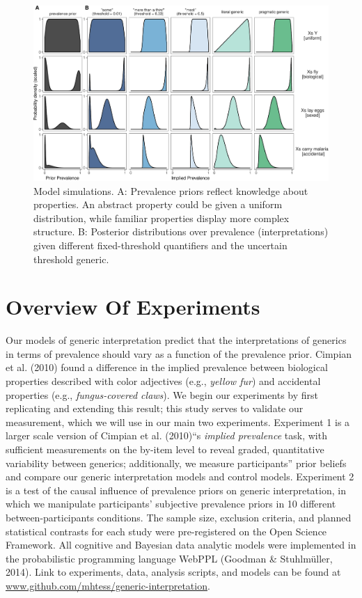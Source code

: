 \documentclass[floatsintext,doc]{apa6}
\begin{document}
\begin{figure}
\centering
\includegraphics{genint_files/figure-latex/modelSimulations-1.pdf}
\caption{\label{fig:modelSimulations}Model simulations. A: Prevalence priors reflect knowledge about properties. An abstract property could be given a uniform distribution, while familiar properties display more complex structure. B: Posterior distributions over prevalence (interpretations) given different fixed-threshold quantifiers and the uncertain threshold generic.}
\end{figure}

\hypertarget{overview-of-experiments}{%
\section{Overview Of Experiments}\label{overview-of-experiments}}

Our models of generic interpretation predict that the interpretations of generics in terms of prevalence should vary as a function of the prevalence prior.
Cimpian et al. (2010) found a difference in the implied prevalence between biological properties described with color adjectives (e.g., \emph{yellow fur}) and accidental properties (e.g., \emph{fungus-covered claws}).
We begin our experiments by first replicating and extending this result; this study serves to validate our measurement, which we will use in our main two experiments.
Experiment 1 is a larger scale version of Cimpian et al. (2010)\enquote{s \emph{implied prevalence} task, with sufficient measurements on the by-item level to reveal graded, quantitative variability between generics; additionally, we measure participants} prior beliefs and compare our generic interpretation models and control models.
Experiment 2 is a test of the causal influence of prevalence priors on generic interpretation, in which we manipulate participants' subjective prevalence priors in 10 different between-participants conditions.
The sample size, exclusion criteria, and planned statistical contrasts for each study were pre-registered on the Open Science Framework.
All cognitive and Bayesian data analytic models were implemented in the probabilistic programming language WebPPL (Goodman \& Stuhlmüller, 2014).
Link to experiments, data, analysis scripts, and models can be found at \url{www.github.com/mhtess/generic-interpretation}.
\end{document}
